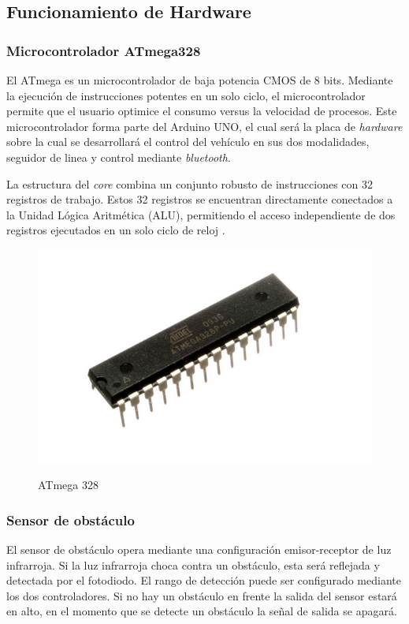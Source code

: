 \newpage
\subsection{Funcionamiento de Hardware}

\subsubsection{Microcontrolador ATmega328}
El ATmega es un microcontrolador de baja potencia CMOS de 8 bits. Mediante la ejecución de instrucciones potentes en un solo ciclo, el microcontrolador permite que el usuario optimice el consumo versus la velocidad de procesos. Este microcontrolador forma parte del Arduino UNO, el cual será la placa de \textit{hardware} sobre la cual se desarrollará el control del vehículo en sus dos modalidades, seguidor de linea y control mediante \textit{bluetooth}. 

La estructura del \textit{core} combina un conjunto robusto de instrucciones con 32 registros de trabajo. Estos 32 registros se encuentran directamente conectados a la Unidad
Lógica Aritmética (ALU), permitiendo el acceso independiente de dos registros ejecutados en un solo ciclo de reloj \cite{atmega}. 

\begin{figure}[H]
    \centering
    \includegraphics[width = 7 cm]{imagenes/micro.PNG}
    \caption{ATmega 328}
    \cite{atmega}
\end{figure}

\subsubsection{Sensor de obstáculo}
El sensor de obstáculo opera mediante una configuración emisor-receptor de luz infrarroja. Si la luz infrarroja choca contra un obstáculo, esta será reflejada y detectada por el fotodiodo. El rango de detección puede ser configurado mediante los dos controladores. Si no hay un obstáculo en frente la salida del sensor estará en alto, en el momento que se detecte un obstáculo la señal de salida se apagará.

